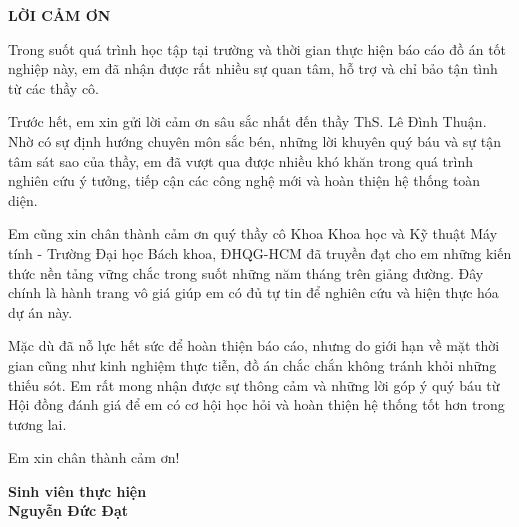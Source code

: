 \begin{center}
    \Large{\textbf{LỜI CẢM ƠN}}
\end{center}

Trong suốt quá trình học tập tại trường và thời gian thực hiện báo cáo đồ án tốt nghiệp này, em đã nhận được rất nhiều sự quan tâm, hỗ trợ và chỉ bảo tận tình từ các thầy cô.

Trước hết, em xin gửi lời cảm ơn sâu sắc nhất đến thầy ThS. Lê Đình Thuận. Nhờ có sự định hướng chuyên môn sắc bén, những lời khuyên quý báu và sự tận tâm sát sao của thầy, em đã vượt qua được nhiều khó khăn trong quá trình nghiên cứu ý tưởng, tiếp cận các công nghệ mới và hoàn thiện hệ thống toàn diện.

Em cũng xin chân thành cảm ơn quý thầy cô Khoa Khoa học và Kỹ thuật Máy tính - Trường Đại học Bách khoa, ĐHQG-HCM đã truyền đạt cho em những kiến thức nền tảng vững chắc trong suốt những năm tháng trên giảng đường. Đây chính là hành trang vô giá giúp em có đủ tự tin để nghiên cứu và hiện thực hóa dự án này.

Mặc dù đã nỗ lực hết sức để hoàn thiện báo cáo, nhưng do giới hạn về mặt thời gian cũng như kinh nghiệm thực tiễn, đồ án chắc chắn không tránh khỏi những thiếu sót. Em rất mong nhận được sự thông cảm và những lời góp ý quý báu từ Hội đồng đánh giá để em có cơ hội học hỏi và hoàn thiện hệ thống tốt hơn trong tương lai.

Em xin chân thành cảm ơn!
\vspace{0.8cm}
\begin{flushright}
    \textbf{Sinh viên thực hiện} \\[1.8cm]
    \textbf{Nguyễn Đức Đạt}
\end{flushright}